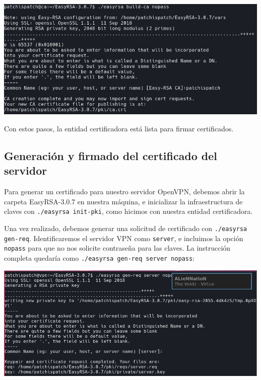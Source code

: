 \documentclass[11pt,a4paper]{article}
\begin{document}
\medskip

\begin{center}
\includegraphics[scale=0.4]{build-ca.png}
\end{center}

\medskip

Con estos pasos, la entidad certificadora está lista para firmar certificados.


\subsection{Generación y firmado del certificado del servidor}

Para generar un certificado para nuestro servidor OpenVPN, debemos abrir la carpeta EasyRSA-3.0.7 en nuestra máquina, e inicializar la infraestructura de claves con \texttt{./easyrsa init-pki}, como hicimos con nuestra entidad certificadora.

\medskip

Una vez realizado, debemos generar una solicitud de certificado con \texttt{./easyrsa gen-req}. Identificaremos el servidor VPN como \texttt{server}, e incluimos la opción \texttt{nopass} para que no nos solicite contraseña para las claves. La instrucción completa quedaría como \texttt{./easyrsa gen-req server nopass}:

\medskip

\begin{center}
\includegraphics[scale=0.4]{gen-req.png}
\end{center}
\end{document}
